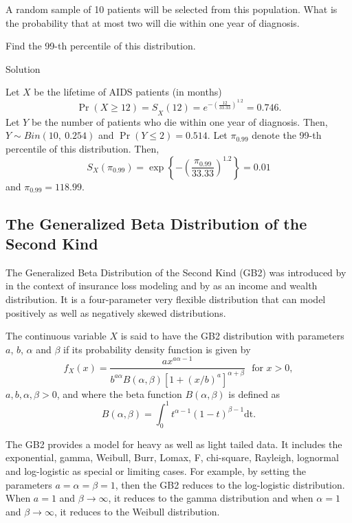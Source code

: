 \documentclass[]{book}
\begin{document}
A random sample of 10 patients will be selected from this population.
What is the probability that at most two will die within one year of
diagnosis.

Find the 99-th percentile of this distribution.

Solution

Let \(X\) be the lifetime of AIDS patients (in months)
\[{\Pr\left( X \geq 12 \right) = S}_{X}\left( 12 \right) = e^{- \left( \frac{12}{33.33} \right)^{1.2}} = 0.746.\]
Let \(Y\) be the number of patients who die within one year of
diagnosis. Then, \(Y\sim Bin\left( 10,\ 0.254 \right)\) and
\(\Pr\left( Y \leq 2 \right) = 0.514.\) Let \(\pi_{0.99}\) denote the
99-th percentile of this distribution. Then,
\[S_{X}\left( \pi_{0.99} \right) = \exp\left\{- \left( \frac{\pi_{0.99}}{33.33} \right)^{1.2}\right\} = 0.01\]
and \(\pi_{0.99} = 118.99\).

\subsection{The Generalized Beta Distribution of the Second
Kind}\label{the-generalized-beta-distribution-of-the-second-kind}

The Generalized Beta Distribution of the Second Kind (GB2) was
introduced by \citet{venter1983transformed} in the context of insurance
loss modeling and by \citet{mcdonald1984some} as an income and wealth
distribution. It is a four-parameter very flexible distribution that can
model positively as well as negatively skewed distributions.

The continuous variable \(X\) is said to have the GB2 distribution with
parameters \(a\), \(b\), \(\alpha\) and \(\beta\) if its probability
density function is given by
\[f_{X}\left( x \right) = \frac{ax^{a \alpha - 1}}{b^{a \alpha}B\left( \alpha,\beta \right)\left\lbrack 1 + \left( x/b \right)^{a} \right\rbrack^{\alpha + \beta}} \ \ \ \text{for } x > 0,\]
\(a,b,\alpha,\beta > 0\), and where the beta function
\(B\left( \alpha,\beta \right)\) is defined as
\[B\left( \alpha,\beta \right) = \int_{0}^{1}{t^{\alpha - 1}\left( 1 - t \right)^{\beta - 1}}\text{dt}.\]

The GB2 provides a model for heavy as well as light tailed data. It
includes the exponential, gamma, Weibull, Burr, Lomax, F, chi-square,
Rayleigh, lognormal and log-logistic as special or limiting cases. For
example, by setting the parameters \(a = \alpha = \beta = 1\), then the
GB2 reduces to the log-logistic distribution. When \(a = 1\) and
\(\beta \rightarrow \infty\), it reduces to the gamma distribution and
when \(\alpha = 1\) and \(\beta \rightarrow \infty\), it reduces to the
Weibull distribution.
\end{document}
